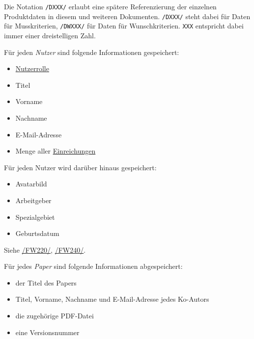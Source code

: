 
Die Notation \texttt{/DXXX/} erlaubt eine spätere Referenzierung der einzelnen Produktdaten in diesem und weiteren
Dokumenten. \texttt{/DXXX/} steht dabei für Daten für Musskriterien, \texttt{/DWXXX/} für Daten für Wunschkriterien. \texttt{XXX} entspricht dabei immer einer dreistelligen Zahl.

\begin{description}

	 Für jeden \emph{Nutzer} sind folgende Informationen gespeichert:
	\begin{itemize}
		\item \hyperref[produktfunktionen]{Nutzerrolle}
		\item Titel
		\item Vorname
		\item Nachname
		\item E-Mail-Adresse
		\item Menge aller \hyperref[d025]{Einreichungen}
	\end{itemize}

	 Für jeden Nutzer wird darüber hinaus gespeichert:
	\begin{itemize}
		\item Avatarbild
		\item Arbeitgeber
		\item Spezialgebiet
		\item Geburtsdatum
	\end{itemize}
	Siehe \hyperref[funkt:220]{/FW220/}, \hyperref[funkt:240]{/FW240/}.

	 Für jedes \emph{Paper} sind folgende Informationen abgespeichert:
	\begin{itemize}
		\item der Titel des Papers
		\item Titel, Vorname, Nachname und E-Mail-Adresse jedes Ko-Autors
		\item die zugehörige PDF-Datei
		\item eine Versionsnummer
	\end{itemize}


\end{description}
